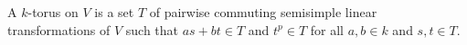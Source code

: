 A $k$-torus on $V$ is a set $T$ of pairwise commuting semisimple linear transformations of $V$ such that $as + bt \in T$ and $t^p \in T$ for all $a, b \in k$ and $s, t \in T$.
